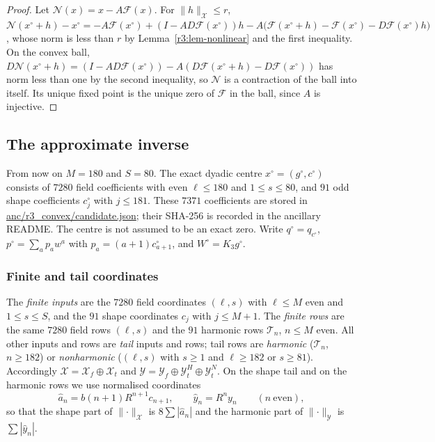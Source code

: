 \documentclass[11pt]{amsart}
\theoremstyle{definition}
\theoremstyle{remark}
\numberwithin{equation}{section}
\newcommand{\Fc}{\mathcal{F}}
\newcommand{\Nc}{\mathcal{N}}
\newcommand{\nrm}[1]{\lVert #1\rVert}
\begin{document}
\begin{proof}
Let $\Nc(x)=x-A\Fc(x)$. For $\nrm h_{\mathcal X}\leq r$, $\Nc(x^\circ+h)-x^\circ=-A\Fc(x^\circ)+(I-AD\Fc(x^\circ))h-A\big(\Fc(x^\circ+h)-\Fc(x^\circ)-D\Fc(x^\circ)h\big)$, whose norm is less than $r$ by Lemma~\ref{r3:lem-nonlinear} and the first inequality. On the convex ball, $D\Nc(x^\circ+h)=(I-AD\Fc(x^\circ))-A(D\Fc(x^\circ+h)-D\Fc(x^\circ))$ has norm less than one by the second inequality, so $\Nc$ is a contraction of the ball into itself. Its unique fixed point is the unique zero of $\Fc$ in the ball, since $A$ is injective.
\end{proof}

\subsection{The approximate inverse}\label{r3:sec-inverse}

From now on $M=180$ and $S=80$. The exact dyadic centre $x^\circ=(g^\circ,c^\circ)$ consists of $7280$ field coefficients with even $\ell\leq180$ and $1\leq s\leq80$, and $91$ odd shape coefficients $c_j^\circ$ with $j\leq181$. These $7371$ coefficients are stored in \url{anc/r3_convex/candidate.json}; their SHA-256 is recorded in the ancillary README. The centre is not assumed to be an exact zero. Write $q^\circ=q_{c^\circ}$, $p^\circ=\sum_ap_aw^a$ with $p_a=(a+1)c^\circ_{a+1}$, and $W^\circ=K_3g^\circ$.

\subsubsection*{Finite and tail coordinates}
The \emph{finite inputs} are the $7280$ field coordinates $(\ell,s)$ with $\ell\leq M$ even and $1\leq s\leq S$, and the $91$ shape coordinates $c_j$ with $j\leq M+1$. The \emph{finite rows} are the same $7280$ field rows $(\ell,s)$ and the $91$ harmonic rows $\mathcal T_n$, $n\leq M$ even. All other inputs and rows are \emph{tail} inputs and rows; tail rows are \emph{harmonic} ($\mathcal T_n$, $n\geq182$) or \emph{nonharmonic} ($(\ell,s)$ with $s\geq1$ and $\ell\geq182$ or $s\geq81$). Accordingly $\mathcal X=\mathcal X_f\oplus\mathcal X_t$ and $\mathcal Y=\mathcal Y_f\oplus\mathcal Y^H_t\oplus\mathcal Y^N_t$. On the shape tail and on the harmonic rows we use normalised coordinates
\[
\hat a_n=b(n+1)R^{n+1}c_{n+1},\qquad\hat y_n=R^ny_n\qquad(n\ \text{even}),
\]
so that the shape part of $\nrm\cdot_{\mathcal X}$ is $8\sum|\hat a_n|$ and the harmonic part of $\nrm\cdot_{\mathcal Y}$ is $\sum|\hat y_n|$.
\end{document}
